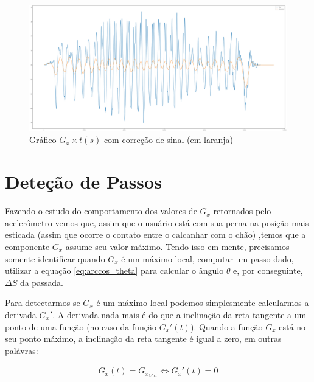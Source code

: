 \documentclass{article}
\begin{document}
            \begin{figure}[h!]
                \centering
                \includegraphics[width=.8\textwidth]{img/Smoothed_data.png}
                \caption{Gráfico $G_x \times t(s)$ com correção de sinal (em laranja)}
                \label{img:smoothed_plot} 
            \end{figure}

        \section{Deteção de Passos}
        Fazendo o estudo do comportamento dos valores de $G_x$ retornados pelo acelerômetro vemos que, assim
        que o usuário está com sua perna na posição mais esticada (assim que ocorre o contato entre o
        calcanhar com o chão) ,temos que a componente $G_x$  assume seu valor máximo. Tendo isso em mente,
        precisamos somente identificar quando $G_x$ é um máximo local, computar um passo dado, utilizar a
        equação \ref{eq:arccos_theta} para calcular o ângulo $\theta$ e, por conseguinte, $\Delta S$ da
        passada.

        Para detectarmos se $G_x$ é um máximo local podemos simplesmente calcularmos a derivada $G_x'$. A
        derivada nada mais é do que a inclinação da reta tangente a um ponto de uma função (no caso da função $G_x'(t)$).
        Quando a função $G_x$ está no seu ponto máximo, a inclinação da reta tangente é igual a zero, em
        outras palávras:

        \begin{align}
            G_x(t) = G_{x_{Max}} \iff G_x'(t) = 0
        \end{align}
\end{document}
